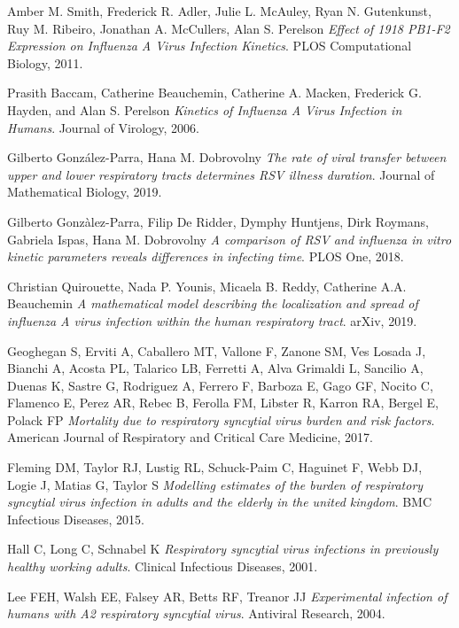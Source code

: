 \documentclass[a4paper]{article}
\begin{document}
\begin{thebibliography}{9}
Amber M. Smith, Frederick R. Adler, Julie L. McAuley, Ryan N. Gutenkunst, Ruy M. Ribeiro, Jonathan A. McCullers, Alan S. Perelson
\textit{Effect of 1918 PB1-F2 Expression on Influenza A Virus Infection Kinetics}. 
PLOS Computational Biology, 2011.

Prasith Baccam, Catherine Beauchemin, Catherine A. Macken, Frederick G. Hayden, and Alan S. Perelson
\textit{Kinetics of Influenza A Virus Infection in Humans}. 
Journal of Virology, 2006.

Gilberto González-Parra, Hana M. Dobrovolny
\textit{The rate of viral transfer between upper and lower
respiratory tracts determines RSV illness duration}. 
Journal of Mathematical Biology, 2019.

Gilberto Gonzàlez-Parra, Filip De Ridder, Dymphy Huntjens, Dirk Roymans, Gabriela Ispas, Hana M. Dobrovolny
\textit{A comparison of RSV and influenza in vitro kinetic
parameters reveals differences in infecting time}. 
PLOS One, 2018.

Christian Quirouette, Nada P. Younis, Micaela B. Reddy, Catherine A.A. Beauchemin
\textit{A mathematical model describing the localization and spread of
influenza A virus infection within the human respiratory tract}. 
arXiv, 2019.

Geoghegan S, Erviti A, Caballero MT, Vallone F, Zanone SM, Ves Losada J, Bianchi A, Acosta PL, Talarico LB, Ferretti A, Alva Grimaldi L, Sancilio A, Duenas K, Sastre G, Rodriguez A, Ferrero F, Barboza E, Gago GF, Nocito C, Flamenco E, Perez AR, Rebec B, Ferolla FM, Libster R, Karron RA, Bergel E, Polack FP
\textit{Mortality due to respiratory syncytial virus burden and risk factors}. 
American Journal of Respiratory and Critical Care Medicine, 2017.

Fleming DM, Taylor RJ, Lustig RL, Schuck-Paim C, Haguinet F, Webb DJ, Logie J, Matias G, Taylor S
\textit{Modelling estimates of the burden of respiratory syncytial virus infection in adults and the elderly in the united kingdom}.
BMC Infectious Diseases, 2015.

Hall C, Long C, Schnabel K
\textit{Respiratory syncytial virus infections in previously healthy working
adults}. 
Clinical Infectious Diseases, 2001.

Lee FEH, Walsh EE, Falsey AR, Betts RF, Treanor JJ
\textit{Experimental infection of humans with A2
respiratory syncytial virus}. 
Antiviral Research, 2004.


\end{thebibliography}
\end{document}
